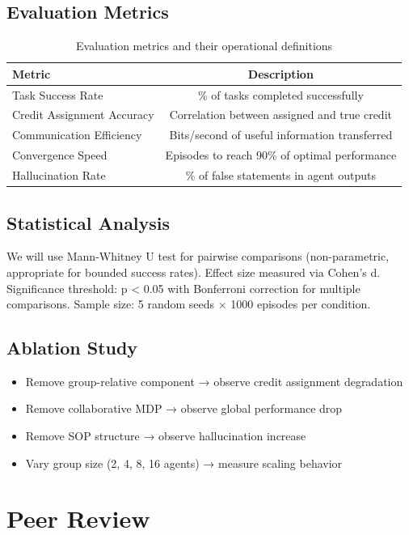 \documentclass[11pt]{article}
\begin{document}
\subsection{Evaluation Metrics}
\begin{table}[h]
\centering
\begin{tabular}{lc}
\toprule
Metric & Description \\
\midrule
Task Success Rate & \% of tasks completed successfully \\
Credit Assignment Accuracy & Correlation between assigned and true credit \\
Communication Efficiency & Bits/second of useful information transferred \\
Convergence Speed & Episodes to reach 90\% of optimal performance \\
Hallucination Rate & \% of false statements in agent outputs \\
\bottomrule
\end{tabular}
\caption{Evaluation metrics and their operational definitions}
\end{table}

\subsection{Statistical Analysis}
We will use Mann-Whitney U test for pairwise comparisons (non-parametric,
appropriate for bounded success rates). Effect size measured via Cohen's d.
Significance threshold: p < 0.05 with Bonferroni correction for multiple comparisons.
Sample size: 5 random seeds × 1000 episodes per condition.

\subsection{Ablation Study}
\begin{itemize}
\item Remove group-relative component → observe credit assignment degradation
\item Remove collaborative MDP → observe global performance drop
\item Remove SOP structure → observe hallucination increase
\item Vary group size (2, 4, 8, 16 agents) → measure scaling behavior
\end{itemize}

\section{Peer Review}
\end{document}
